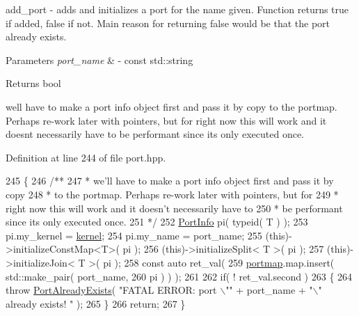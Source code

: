 add\+\_\+port -\/ adds and initializes a port for the name given. Function returns true if added, false if not. Main reason for returning false would be that the port already exists. 
\begin{DoxyParams}{Parameters}
{\em port\+\_\+name} & -\/ const std\+::string \\
\hline
\end{DoxyParams}
\begin{DoxyReturn}{Returns}
bool 
\end{DoxyReturn}
we\textquotesingle{}ll have to make a port info object first and pass it by copy to the portmap. Perhaps re-\/work later with pointers, but for right now this will work and it doesn\textquotesingle{}t necessarily have to be performant since its only executed once.

Definition at line 244 of file port.\+hpp.


\begin{DoxyCode}
245    \{\textcolor{comment}{}
246 \textcolor{comment}{      /**}
247 \textcolor{comment}{       * we'll have to make a port info object first and pass it by copy}
248 \textcolor{comment}{       * to the portmap.  Perhaps re-work later with pointers, but for}
249 \textcolor{comment}{       * right now this will work and it doesn't necessarily have to}
250 \textcolor{comment}{       * be performant since its only executed once.}
251 \textcolor{comment}{       */}
252       \hyperlink{struct_port_info}{PortInfo} pi( \textcolor{keyword}{typeid}( T ) );
253       pi.my\_kernel = \hyperlink{class_port_ac17060db235459adaab87cdccb605884}{kernel};
254       pi.my\_name   = port\_name;
255       (\textcolor{keyword}{this})->initializeConstMap<T>( pi );
256       (\textcolor{keyword}{this})->initializeSplit< T >( pi );
257       (\textcolor{keyword}{this})->initializeJoin< T >( pi );
258       \textcolor{keyword}{const} \textcolor{keyword}{auto} ret\_val(
259                   \hyperlink{class_port_a537a8a0c2a47acbf8654f286200aee90}{portmap}.map.insert( std::make\_pair( port\_name,
260                                                       pi ) ) );
261 
262       \textcolor{keywordflow}{if}( ! ret\_val.second )
263       \{
264          \textcolor{keywordflow}{throw} \hyperlink{class_port_already_exists}{PortAlreadyExists}( \textcolor{stringliteral}{"FATAL ERROR: port \(\backslash\)""} + port\_name + \textcolor{stringliteral}{"\(\backslash\)" already exists!
      "} );
265       \}
266       \textcolor{keywordflow}{return};
267    \}
\end{DoxyCode}
\hypertarget{class_port_aaf89e298b9ae64f9c42703c14d9eed0a}{}\label{class_port_aaf89e298b9ae64f9c42703c14d9eed0a} 
